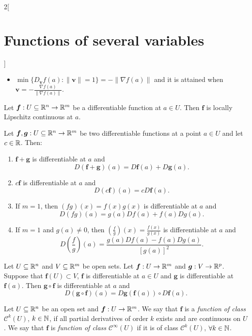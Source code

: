 \documentclass[../../../main.tex]{subfiles}
\begin{document}
\begin{multicols}{2}[\section{Functions of several variables}]
\begin{prop}
\begin{itemize}
    \item $\displaystyle\min\{D_\textbf{v}f(a):\|\textbf{v}\|=1\}=-\|\nabla f(a)\|$ and it is attained when $\displaystyle \textbf{v}=-\frac{\nabla f(a)}{\|\nabla f(a)\|}$.
\end{itemize}
\end{prop}
\begin{theorem}
Let $\boldsymbol{f}:U\subseteq\mathbb{R}^n\rightarrow\mathbb{R}^m$ be a differentiable function at $a\in U$. Then $\boldsymbol{f}$ is locally Lipschitz continuous at $a$.
\end{theorem}
\begin{theorem} 
Let $\boldsymbol{f},\boldsymbol{g}:U\subseteq\mathbb{R}^n\to\mathbb{R}^m$ be two differentiable functions at a point $a\in U$ and let $c\in\mathbb{R} $. Then:
\begin{enumerate}
    \item $\boldsymbol{f}+\boldsymbol{g}$ is differentiable at $a$ and $$D(\boldsymbol{f}+\boldsymbol{g})(a)=D\boldsymbol{f}(a)+D\boldsymbol{g}(a).$$
    \item $c\boldsymbol{f}$ is differentiable at $a$ and
    $$D(c\boldsymbol{f})(a)=cD\boldsymbol{f}(a).$$
    \item If $m=1$, then $(fg)(x)=f(x)g(x)$ is differentiable at $a$ and $$D(fg)(a)=g(a)Df(a)+f(a)Dg(a).$$
    \item If $m=1$ and $g(a)\ne0$, then $\displaystyle\left(\frac{f}{g}\right)(x)=\frac{f(x)}{g(x)}$ is differentiable at $a$ and $$D\left(\frac{f}{g}\right)(a)=\frac{g(a)Df(a)-f(a)Dg(a)}{[g(a)]^2}.$$
\end{enumerate}
\end{theorem}
\begin{theorem}
Let $U\subseteq\mathbb{R}^n$ and $V\subseteq\mathbb{R}^m$ be open sets. Let $\boldsymbol{f}:U\rightarrow\mathbb{R}^m$ and $\boldsymbol{g}:V\rightarrow\mathbb{R}^p$. Suppose that $\boldsymbol{f}(U)\subset V$, $\boldsymbol{f}$ is differentiable at $a\in U$ and $\boldsymbol{g}$ is differentiable at $\boldsymbol{f}(a)$. Then $\boldsymbol{g}\circ \boldsymbol{f}$ is differentiable at $a$ and $$D(\boldsymbol{g}\circ \boldsymbol{f})(a)=D\boldsymbol{g}(\boldsymbol{f}(a))\circ D\boldsymbol{f}(a).$$
\end{theorem}
\begin{definition}
Let $U\subseteq\mathbb{R}^n$ be an open set and $\boldsymbol{f}:U\rightarrow\mathbb{R}^m$. We say that $\boldsymbol{f}$ is a \textit{function of class $\mathcal{C}^k(U)$}, $k\in\mathbb{N} $, if all partial derivatives of order $k$ exists and are continuous on $U$. We say that $\boldsymbol{f}$ is \textit{function of class $\mathcal{C}^\infty(U)$} if it is of class $\mathcal{C}^k(U)$, $\forall k\in\mathbb{N} $.

\end{definition}
\end{multicols}
\end{document}
